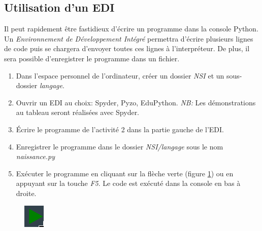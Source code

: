 \documentclass[a4paper,11pt]{article}
\begin{document}
\begin{Form}
\subsection{Utilisation d'un EDI}
Il peut rapidement être fastidieux d'écrire un programme dans la console Python. Un \emph{Environnement de Développement Intégré} permettra d'écrire plusieurs lignes de code puis se chargera d'envoyer toutes ces lignes à l'interpréteur. De plus, il sera possible d'enregistrer le programme dans un fichier.
\begin{activite}
\begin{enumerate}
\item Dans l'espace personnel de l'ordinateur, créer un dossier \emph{NSI} et un sous-dossier \emph{langage}.
\item Ouvrir un EDI au choix: Spyder, Pyzo, EduPython. \emph{NB:} Les démonstrations au tableau seront réalisées avec Spyder.
\item Écrire le programme de l'activité 2 dans la partie gauche de l'EDI.
\item Enregistrer le programme dans le dossier \emph{NSI/langage} sous le nom \emph{naissance.py}
\item Exécuter le programme en cliquant sur la flèche verte (figure \ref{execution}) ou en appuyant sur la touche \emph{F5}. Le code est exécuté dans la console en bas à droite.
\end{enumerate}
\end{activite}
\begin{figure}[!h]
\centering
\includegraphics[width=1cm]{ressources/execution.png}
\label{execution}
\end{figure}

\end{Form}
\end{document}
